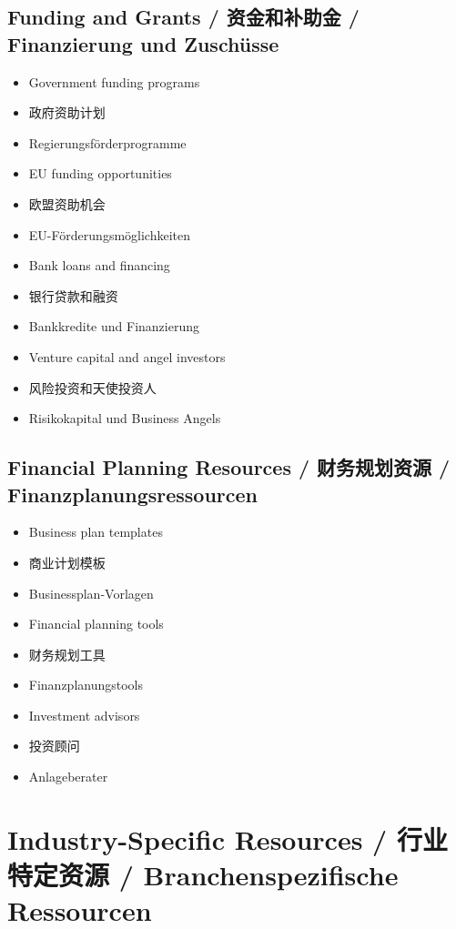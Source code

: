\subsection{Funding and Grants / 资金和补助金 / Finanzierung und Zuschüsse}
\begin{itemize}
    \item Government funding programs
    \item 政府资助计划
    \item Regierungsförderprogramme
    \item EU funding opportunities
    \item 欧盟资助机会
    \item EU-Förderungsmöglichkeiten
    \item Bank loans and financing
    \item 银行贷款和融资
    \item Bankkredite und Finanzierung
    \item Venture capital and angel investors
    \item 风险投资和天使投资人
    \item Risikokapital und Business Angels
\end{itemize}

\subsection{Financial Planning Resources / 财务规划资源 / Finanzplanungsressourcen}
\begin{itemize}
    \item Business plan templates
    \item 商业计划模板
    \item Businessplan-Vorlagen
    \item Financial planning tools
    \item 财务规划工具
    \item Finanzplanungstools
    \item Investment advisors
    \item 投资顾问
    \item Anlageberater
\end{itemize}

\section{Industry-Specific Resources / 行业特定资源 / Branchenspezifische Ressourcen}


